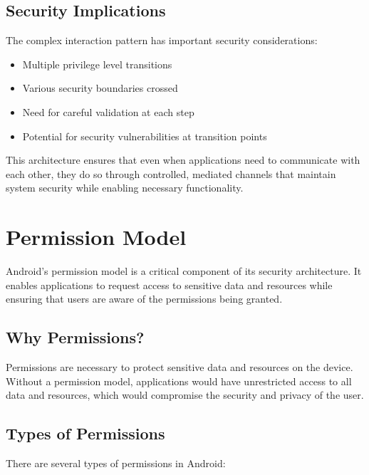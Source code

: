 \documentclass{article}
\begin{document}
\subsection{Security Implications}
The complex interaction pattern has important security considerations:
\begin{itemize}
    \item Multiple privilege level transitions
    \item Various security boundaries crossed
    \item Need for careful validation at each step
    \item Potential for security vulnerabilities at transition points
\end{itemize}

This architecture ensures that even when applications need to communicate with each other, they do so through controlled, mediated channels that maintain system security while enabling necessary functionality.

\section{Permission Model}

Android's permission model is a critical component of its security architecture. It enables applications to request access to sensitive data and resources while ensuring that users are aware of the permissions being granted.

\subsection{Why Permissions?}

Permissions are necessary to protect sensitive data and resources on the device. Without a permission model, applications would have unrestricted access to all data and resources, which would compromise the security and privacy of the user.

\subsection{Types of Permissions}

There are several types of permissions in Android:
\end{document}
